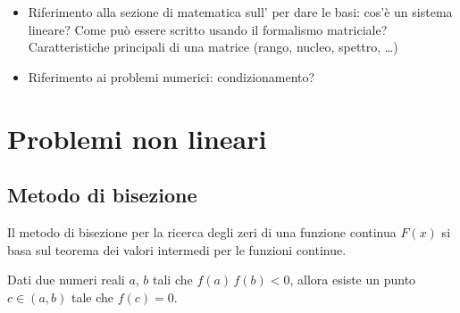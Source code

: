 \documentclass[letterpaper,10pt,english]{jupyterBook}
\begin{document}
\sphinxAtStartPar
{}
\begin{itemize}
\item {} 
\sphinxAtStartPar
Riferimento alla sezione di matematica sull’ per dare le basi: cos’è un sistema lineare? Come può essere scritto usando il formalismo matriciale? Caratteristiche principali di una matrice (rango, nucleo, spettro, …)

\item {} 
\sphinxAtStartPar
Riferimento ai problemi numerici: condizionamento?

\end{itemize}

\sphinxstepscope


\section{Problemi non lineari}
\label{\detokenize{ch/numerics/nonlinear:problemi-non-lineari}}\label{\detokenize{ch/numerics/nonlinear::doc}}

\subsection{Metodo di bisezione}
\label{\detokenize{ch/numerics/nonlinear:metodo-di-bisezione}}
\sphinxAtStartPar
Il metodo di bisezione per la ricerca degli zeri di una funzione continua \(F(x)\) si basa sul teorema dei valori intermedi per le funzioni continue.

\sphinxAtStartPar
Dati due numeri reali \(a\), \(b\) tali che \(f(a) \, f(b) < 0\), allora esiste un punto \(c \in (a,b)\) tale che \(f(c) = 0\).
\end{document}

